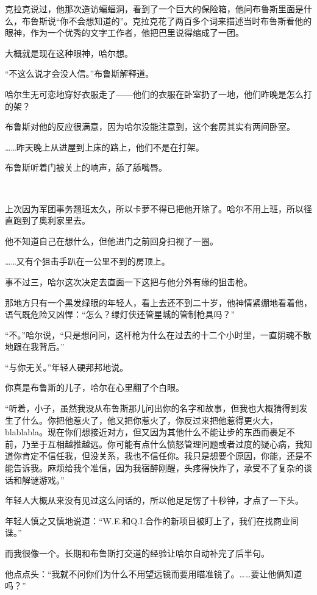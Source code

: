 \documentclass[../main.tex]{subfiles}
\begin{document}
克拉克说过，他那次造访蝙蝠洞，看到了一个巨大的保险箱，他问布鲁斯里面是什么，布鲁斯说“你不会想知道的”。克拉克花了两百多个词来描述当时布鲁斯看他的眼神，作为一个优秀的文字工作者，他把巴里说得缩成了一团。

大概就是现在这种眼神，哈尔想。

“不这么说才会没人信。”布鲁斯解释道。

哈尔生无可恋地穿好衣服走了——他们的衣服在卧室扔了一地，他们昨晚是怎么打的架？

布鲁斯对他的反应很满意，因为哈尔没能注意到，这个套房其实有两间卧室。

……昨天晚上从进屋到上床的路上，他们不是在打架。

布鲁斯听着门被关上的响声，舔了舔嘴唇。

~\

上次因为军团事务翘班太久，所以卡萝不得已把他开除了。哈尔不用上班，所以径直跑到了奥利家里去。

他不知道自己在想什么，但他进门之前回身扫视了一圈。

……又有个狙击手趴在一公里不到的房顶上。

事不过三，哈尔这次决定去直面一下这把与他分外有缘的狙击枪。

那地方只有一个黑发绿眼的年轻人，看上去还不到二十岁，他神情紧绷地看着他，语气既危险又凶悍：“怎么？绿灯侠还管星城的管制枪具吗？”

“不。”哈尔说，“只是想问问，这杆枪为什么在过去的十二个小时里，一直阴魂不散地跟在我背后。”

“与你无关。”年轻人硬邦邦地说。

你真是布鲁斯的儿子，哈尔在心里翻了个白眼。

“听着，小子，虽然我没从布鲁斯那儿问出你的名字和故事，但我也大概猜得到发生了什么。你把他惹火了，他又把你惹火了，你反过来把他惹得更火大，blablabla。现在你们想接近对方，但又因为其他什么不能让步的东西而裹足不前，乃至于互相越推越远。你可能有点什么愤怒管理问题或者过度的疑心病，我知道你肯定不信任我，但没关系，我也不信任你。我只是想要个原因，你能，还是不能告诉我。麻烦给我个准信，因为我宿醉刚醒，头疼得快炸了，承受不了复杂的谈话和解谜游戏。”

年轻人大概从来没有见过这么问话的，所以他足足愣了十秒钟，才点了一下头。

年轻人慎之又慎地说道：“W.E.和Q.I.合作的新项目被盯上了，我们在找商业间谍。”

而我很像一个。长期和布鲁斯打交道的经验让哈尔自动补完了后半句。

他点点头：“我就不问你们为什么不用望远镜而要用瞄准镜了。……要让他俩知道吗？”
\end{document}
